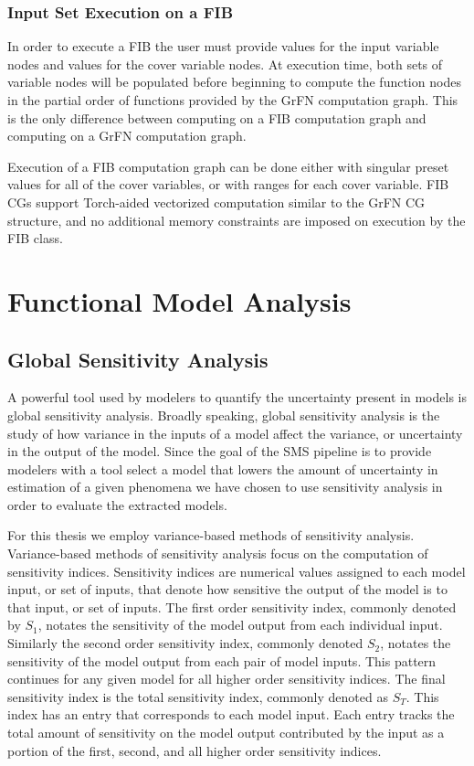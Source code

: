 \subsubsection{Input Set Execution on a FIB\label{sec:fib_exec}}
In order to execute a FIB the user must provide values for the input variable nodes and values for the cover variable nodes. At execution time, both sets of variable nodes will be populated before beginning to compute the function nodes in the partial order of functions provided by the GrFN computation graph. This is the only difference between computing on a FIB computation graph and computing on a GrFN computation graph.

Execution of a FIB computation graph can be done either with singular preset values for all of the cover variables, or with ranges for each cover variable.
FIB CGs support Torch-aided vectorized computation similar to the GrFN CG structure, and no additional memory constraints are imposed on execution by the FIB class.

\section{Functional Model Analysis\label{sec:functional_analysis}}

\subsection{Global Sensitivity Analysis\label{sec:sens_analysis}}
A powerful tool used by modelers to quantify the uncertainty present in models is global sensitivity analysis. Broadly speaking, global sensitivity analysis is the study of how variance in the inputs of a model affect the variance, or uncertainty in the output of the model. Since the goal of the SMS pipeline is to provide modelers with a tool select a model that lowers the amount of uncertainty in estimation of a given phenomena we have chosen to use sensitivity analysis in order to evaluate the extracted models.

For this thesis we employ variance-based methods of sensitivity analysis.
Variance-based methods of sensitivity analysis focus on the computation of sensitivity indices. Sensitivity indices are numerical values assigned to each model input, or set of inputs, that denote how sensitive the output of the model is to that input, or set of inputs. The first order sensitivity index, commonly denoted by $S_1$, notates the sensitivity of the model output from each individual input. Similarly the second order sensitivity index, commonly denoted $S_2$, notates the sensitivity of the model output from each pair of model inputs. This pattern continues for any given model for all higher order sensitivity indices.
The final sensitivity index is the total sensitivity index, commonly denoted as $S_T$. This index has an entry that corresponds to each model input. Each entry tracks the total amount of sensitivity on the model output contributed by the input as a portion of the first, second, and all higher order sensitivity indices.

